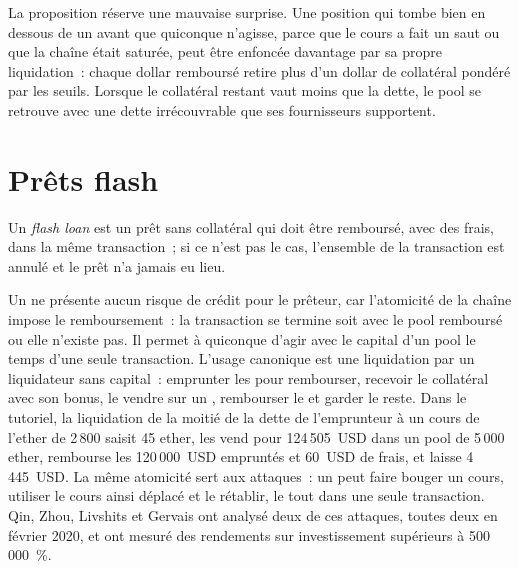 La proposition réserve une mauvaise surprise. Une position qui tombe bien en dessous de un avant que quiconque n'agisse, parce que le cours a fait un saut ou que la chaîne était saturée, peut
être enfoncée davantage par sa propre liquidation~: chaque dollar remboursé retire plus d'un dollar de collatéral pondéré par les seuils. Lorsque le collatéral restant
vaut moins que la dette, le pool se retrouve avec une dette irrécouvrable que ses fournisseurs supportent.

\section{Prêts flash}

\begin{definition}\label{def:m3:defi-credit-and-leverage:flash}
Un \emph{flash loan} est un prêt sans collatéral qui doit être remboursé, avec des frais, dans la même transaction~; si ce n'est pas
le cas, l'ensemble de la transaction est annulé et le prêt n'a jamais eu lieu.
\end{definition}

Un  ne présente aucun risque de crédit pour le prêteur, car l'atomicité de la chaîne impose le remboursement~: la transaction se termine soit avec le pool remboursé
ou elle n'existe pas. Il permet à quiconque d'agir avec le capital d'un pool le temps d'une seule transaction. L'usage canonique est une liquidation par un liquidateur sans capital~:
emprunter les  pour rembourser, recevoir le collatéral avec son bonus, le vendre sur un , rembourser le  et garder le reste.
Dans le tutoriel, la liquidation de la moitié de la dette de l'emprunteur à un cours de l'ether de 2\,800 saisit 45 ether, les vend pour 124\,505~USD dans un pool de
5\,000 ether, rembourse les 120\,000~USD empruntés et 60~USD de frais, et laisse 4\,445~USD. La même atomicité sert aux attaques~: un  peut faire bouger un cours,
utiliser le cours ainsi déplacé et le rétablir, le tout dans une seule transaction. Qin, Zhou, Livshits et Gervais ont analysé deux de ces attaques, toutes deux
en février 2020, et ont mesuré des rendements sur investissement supérieurs à 500\,000~\%.

